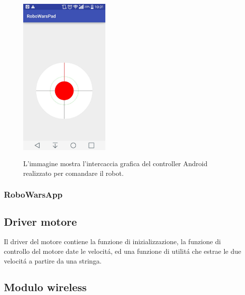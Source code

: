 \documentclass [11pt ,a4paper ,twoside ]{article}
\begin{document}
\begin{figure}
	\centering
		\includegraphics[width=0.4\textwidth]{Images/joy.jpg}
	\label{fig:joy}
	\caption{L'immagine mostra l'intercaccia grafica del controller Android realizzato per comandare il robot.}
\end{figure}

\subsubsection{RoboWarsApp}


\subsection{Driver motore}

Il driver del motore contiene la funzione di inizializzazione, la funzione di controllo del motore date le velocit\'a, ed una funzione di utilit\'a che estrae le due velocit\'a a partire da una stringa.



\subsection{Modulo wireless}
\end{document}

